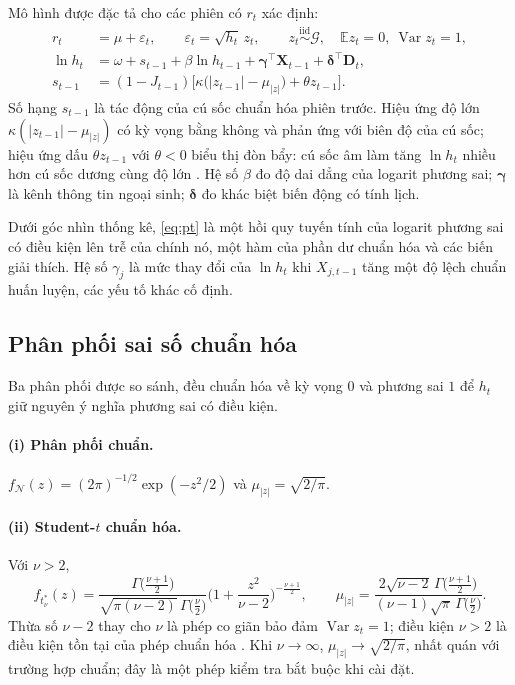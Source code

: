 \documentclass[12pt,a4paper]{article}
\theoremstyle{definition}
\theoremstyle{remark}
\newcommand{\E}{\mathbb{E}}
\newcommand{\Gcal}{\mathcal{G}}
\newcommand{\bgamma}{\boldsymbol{\gamma}}
\newcommand{\bdelta}{\boldsymbol{\delta}}
\newcommand{\bX}{\mathbf{X}}
\newcommand{\bD}{\mathbf{D}}
\begin{document}
Mô hình được đặc tả cho các phiên có $r_t$ xác định:
\begin{align}
r_t&=\mu+\varepsilon_t,\qquad \varepsilon_t=\sqrt{h_t}\,z_t,\qquad z_t\overset{\text{iid}}{\sim}\Gcal,\quad \E z_t=0,\ \operatorname{Var}z_t=1, \label{eq:tb}\\
\ln h_t&=\omega+s_{t-1}+\beta\ln h_{t-1}+\bgamma^\top\bX_{t-1}+\bdelta^\top\bD_t, \label{eq:pt}\\
s_{t-1}&=(1-J_{t-1})\big[\kappa\big(|z_{t-1}|-\mu_{|z|}\big)+\theta z_{t-1}\big]. \label{eq:sock}
\end{align}
Số hạng $s_{t-1}$ là tác động của cú sốc chuẩn hóa phiên trước. Hiệu ứng độ lớn $\kappa(|z_{t-1}|-\mu_{|z|})$ có kỳ vọng bằng không và phản ứng với biên độ của cú sốc; hiệu ứng dấu $\theta z_{t-1}$ với $\theta<0$ biểu thị đòn bẩy: cú sốc âm làm tăng $\ln h_t$ nhiều hơn cú sốc dương cùng độ lớn \cite{nelson1991}. Hệ số $\beta$ đo độ dai dẳng của logarit phương sai; $\bgamma$ là kênh thông tin ngoại sinh; $\bdelta$ đo khác biệt biến động có tính lịch.

Dưới góc nhìn thống kê, \eqref{eq:pt} là một hồi quy tuyến tính của logarit phương sai có điều kiện lên trễ của chính nó, một hàm của phần dư chuẩn hóa và các biến giải thích. Hệ số $\gamma_j$ là mức thay đổi của $\ln h_t$ khi $X_{j,t-1}$ tăng một độ lệch chuẩn huấn luyện, các yếu tố khác cố định.

\subsection{Phân phối sai số chuẩn hóa}\label{sec:phanphoi}

Ba phân phối được so sánh, đều chuẩn hóa về kỳ vọng $0$ và phương sai $1$ để $h_t$ giữ nguyên ý nghĩa phương sai có điều kiện.

\paragraph{(i) Phân phối chuẩn.} $f_{\mathcal N}(z)=(2\pi)^{-1/2}\exp(-z^2/2)$ và $\mu_{|z|}=\sqrt{2/\pi}$.

\paragraph{(ii) Student-$t$ chuẩn hóa.} Với $\nu>2$,
\begin{equation}\label{eq:tstd}
f_{t^*_\nu}(z)=\frac{\Gamma\!\big(\frac{\nu+1}{2}\big)}{\sqrt{\pi(\nu-2)}\,\Gamma\!\big(\frac{\nu}{2}\big)}\Big(1+\frac{z^2}{\nu-2}\Big)^{-\frac{\nu+1}{2}},\qquad
\mu_{|z|}=\frac{2\sqrt{\nu-2}\,\Gamma\!\big(\frac{\nu+1}{2}\big)}{(\nu-1)\sqrt{\pi}\,\Gamma\!\big(\frac{\nu}{2}\big)} .
\end{equation}
Thừa số $\nu-2$ thay cho $\nu$ là phép co giãn bảo đảm $\operatorname{Var}z_t=1$; điều kiện $\nu>2$ là điều kiện tồn tại của phép chuẩn hóa \cite{bollerslev1987}. Khi $\nu\to\infty$, $\mu_{|z|}\to\sqrt{2/\pi}$, nhất quán với trường hợp chuẩn; đây là một phép kiểm tra bắt buộc khi cài đặt.
\end{document}
